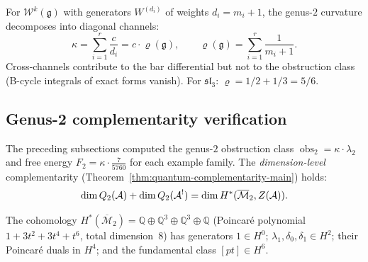 \begin{remark}
\label{rem:w3-genus2-channels}
For $\mathcal{W}^k(\mathfrak{g})$ with generators $W^{(d_i)}$ of weights $d_i = m_i + 1$, the genus-$2$ curvature decomposes into diagonal channels:
\begin{equation}\label{eq:w-genus2-channel-decomp}
\kappa = \sum_{i=1}^{r} \frac{c}{d_i}
= c \cdot \varrho(\mathfrak{g}), \qquad
\varrho(\mathfrak{g}) = \sum_{i=1}^{r} \frac{1}{m_i + 1}.
\end{equation}
Cross-channels contribute to the bar differential but not to the obstruction class (B-cycle integrals of exact forms vanish).  For $\mathfrak{sl}_3$: $\varrho = 1/2 + 1/3 = 5/6$.
\end{remark}

\subsection{Genus-2 complementarity verification}\label{subsec:genus2-complementarity-verification}

The preceding subsections computed the genus-$2$ obstruction class
$\operatorname{obs}_2 = \kappa \cdot \lambda_2$ and free energy
$F_2 = \kappa \cdot \frac{7}{5760}$ for each example family.
The \emph{dimension-level} complementarity
(Theorem~\ref{thm:quantum-complementarity-main}) holds:
\begin{equation}\label{eq:genus2-complementarity-dim}
\dim Q_2(\mathcal{A}) + \dim Q_2(\mathcal{A}^!) = \dim H^*(\overline{\mathcal{M}}_2,
Z(\mathcal{A})).
\end{equation}

The cohomology
$H^*(\overline{\mathcal{M}}_2) = \mathbb{Q} \oplus \mathbb{Q}^3
\oplus \mathbb{Q}^3 \oplus \mathbb{Q}$
(Poincar\'e polynomial $1 + 3t^2 + 3t^4 + t^6$, total dimension~$8$)
has generators $1 \in H^0$; $\lambda_1, \delta_0, \delta_1 \in H^2$;
their Poincar\'e duals in $H^4$; and the fundamental class $[pt] \in H^6$.

